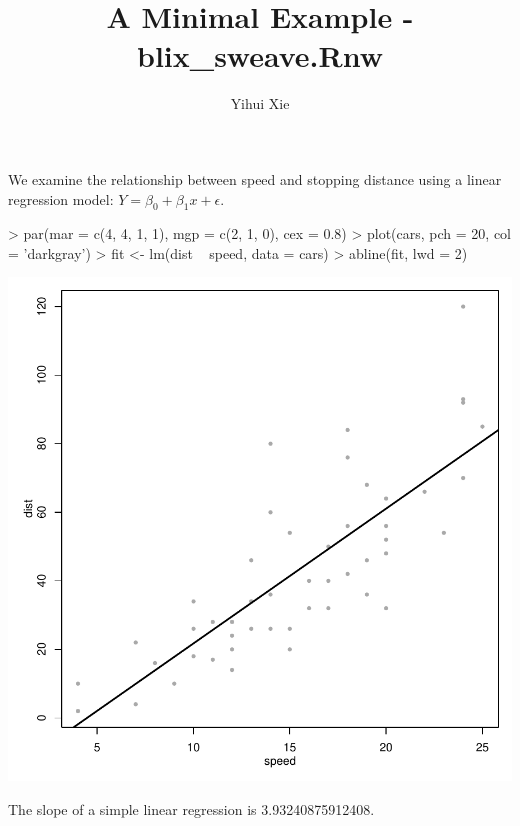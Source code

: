 \documentclass{article}
\begin{document}



\title{A Minimal Example - blix\_sweave.Rnw}
\author{Yihui Xie}
\maketitle
We examine the relationship between speed and stopping
distance using a linear regression model:
$Y = \beta_0 + \beta_1 x + \epsilon$.


\begin{Schunk}
\begin{Sinput}
> par(mar = c(4, 4, 1, 1), mgp = c(2, 1, 0), cex = 0.8)
> plot(cars, pch = 20, col = 'darkgray')
> fit <- lm(dist ~ speed, data = cars)
> abline(fit, lwd = 2)
\end{Sinput}
\end{Schunk}
\includegraphics{blix_sweave-model}

The slope of a simple linear regression is
3.93240875912408.
\end{document}
